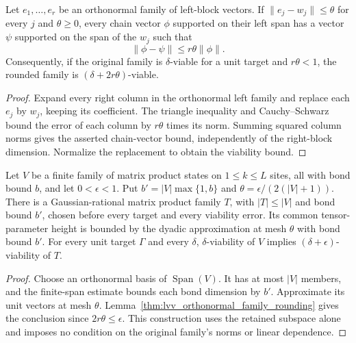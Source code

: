 \begin{lemma}
    \label{thm:lvv_orthonormal_family_rounding}
    \leanok
    Let $e_1,\ldots,e_r$ be an orthonormal family of left-block vectors.
    If $\|e_j-w_j\|\le\theta$ for every $j$ and $\theta\ge0$, every chain
    vector $\phi$ supported on their left span has a vector $\psi$ supported
    on the span of the $w_j$ such that
    \[
        \|\phi-\psi\|\le r\theta\|\phi\|.
    \]
    Consequently, if the original family is $\delta$-viable for a unit
    target and $r\theta<1$, the rounded family is
    $(\delta+2r\theta)$-viable.
\end{lemma}
\begin{proof}\leanok
    Expand every right column in the orthonormal left family and replace
    each $e_j$ by $w_j$, keeping its coefficient. The triangle inequality
    and Cauchy--Schwarz bound the error of each column by $r\theta$
    times its norm. Summing squared column norms gives the asserted
    chain-vector bound, independently of the right-block dimension.
    Normalize the replacement to obtain the viability bound.
\end{proof}

\begin{lemma}
    \label{thm:lvv_rational_orthonormal_family}
    \leanok
    Let $V$ be a finite family of matrix product states on $1\le k\le L$
    sites, all with bond bound $b$, and let $0<\epsilon<1$. Put
    $b'=|V|\max\{1,b\}$ and $\theta=\epsilon/(2(|V|+1))$.
    There is a Gaussian-rational matrix product family $T$, with
    $|T|\le|V|$ and bond bound $b'$, chosen before every target and every
    viability error. Its common tensor-parameter height is bounded by
    the dyadic approximation at mesh $\theta$ with bond bound $b'$.
    For every unit target $\Gamma$ and every $\delta$,
    $\delta$-viability of $V$ implies $(\delta+\epsilon)$-viability of $T$.
\end{lemma}
\begin{proof}\leanok
    Choose an orthonormal basis of $\operatorname{Span}(V)$. It has at
    most $|V|$ members, and the finite-span estimate bounds each bond
    dimension by $b'$. Approximate its unit vectors at mesh $\theta$.
    Lemma~\ref{thm:lvv_orthonormal_family_rounding} gives the conclusion
    since $2r\theta\le\epsilon$. This construction uses the retained
    subspace alone and imposes no condition on the original family's
    norms or linear dependence.
\end{proof}

